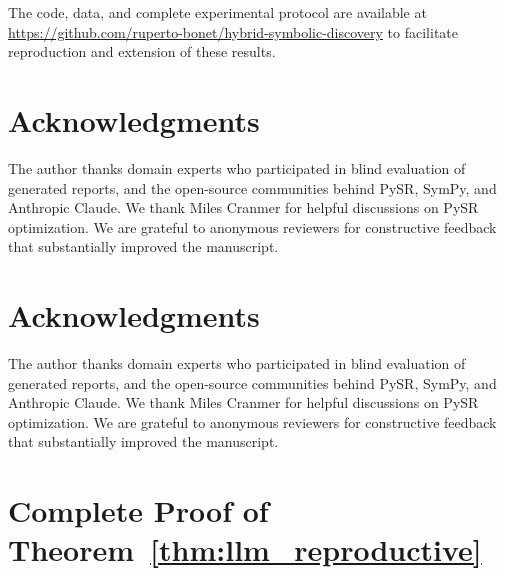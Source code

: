 The code, data, and complete experimental protocol are available at \url{https://github.com/ruperto-bonet/hybrid-symbolic-discovery} to facilitate reproduction and extension of these results.

\section*{Acknowledgments}

The author thanks domain experts who participated in blind evaluation of generated reports, and the open-source communities behind PySR, SymPy, and Anthropic Claude. We thank Miles Cranmer for helpful discussions on PySR optimization. We are grateful to anonymous reviewers for constructive feedback that substantially improved the manuscript.



\section*{Acknowledgments}

The author thanks domain experts who participated in blind evaluation of generated reports, and the open-source communities behind PySR, SymPy, and Anthropic Claude. We thank Miles Cranmer for helpful discussions on PySR optimization. We are grateful to anonymous reviewers for constructive feedback that substantially improved the manuscript.





\appendix

\section{Complete Proof of Theorem~\ref{thm:llm_reproductive}}
\label{app:proof}

